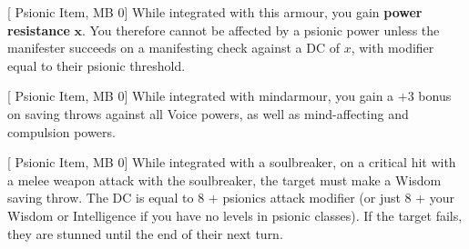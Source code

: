 [%
    Psionic Item, MB 0]
While integrated with this armour,
you gain \textbf{power resistance} $\mathbf{x}$.
You therefore cannot be affected by a psionic power
unless the manifester succeeds on a manifesting check
against a DC of $x$,
with modifier equal to their psionic threshold.

[%
    Psionic Item, MB 0]
While integrated with mindarmour,
you gain a +3 bonus on saving throws against all Voice powers,
as well as mind-affecting and compulsion powers.

[%
    Psionic Item, MB 0]
While integrated with a soulbreaker,
on a critical hit with a melee weapon attack with the soulbreaker,
the target must make a Wisdom saving throw.
The DC is equal to 8 + psionics attack modifier
(or just 8 + your Wisdom or Intelligence if you have no levels
in psionic classes).
If the target fails,
they are stunned until the end of their next turn.
